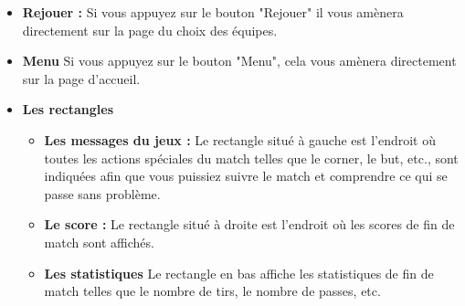 \begin{itemize}
    \item \textbf{Rejouer :} 
        Si vous appuyez sur le bouton "Rejouer" il vous amènera directement sur la page du choix des équipes.

    \vspace{15pt}

    \item \textbf{Menu} 
         Si vous appuyez sur le bouton "Menu", cela vous amènera directement sur la page d'accueil.

    \vspace{15pt}

    \item \textbf{Les rectangles} 
        \begin{itemize}
            
            \item \textbf{Les messages du jeux :}
                Le rectangle situé à gauche est l'endroit où toutes les actions spéciales du match telles que le corner, le but, etc., sont indiquées afin que vous puissiez suivre le match et comprendre ce qui se passe sans problème.
            
            \vspace{15pt}
            
            \item \textbf{Le score :}
                Le rectangle situé à droite est l'endroit où les scores de fin de match sont affichés.

            \vspace{15pt}
            
            \item \textbf{Les statistiques}
                Le rectangle en bas affiche les statistiques de fin de match telles que le nombre de tirs, le nombre de passes, etc.
            
            \vspace{15pt}
        \end{itemize}
        
    \vspace{15pt}
\end{itemize}